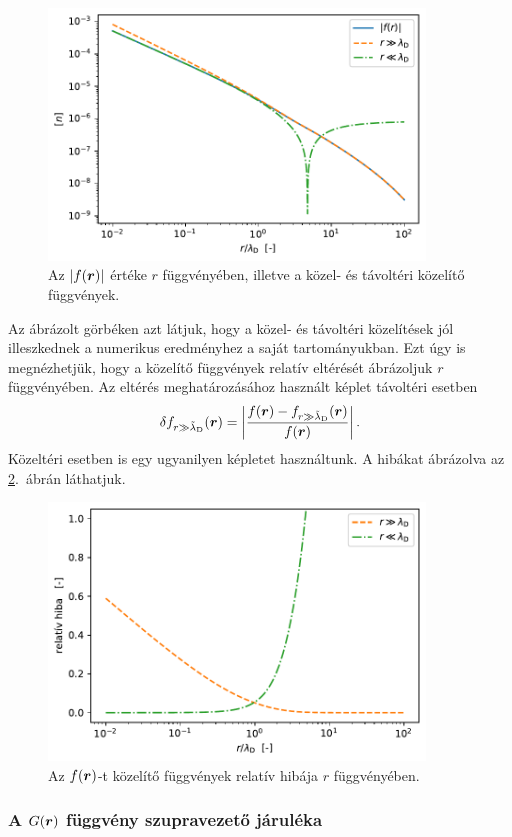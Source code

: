 \documentclass[a4paper,12pt,titlepage]{article}
\newcommand{\RR}{{\vb*{r}}}
\begin{document}
\begin{figure}[h!]
	\centering
	\includegraphics[width=10cm]{F_sc.pdf}
	\caption{Az $\left| f(\RR) \right|$ értéke $r$ függvényében, illetve a közel- és távoltéri közelítő függvények.}
	\label{F-sc-fig}
\end{figure}

Az ábrázolt görbéken azt látjuk, hogy a közel- és távoltéri közelítések jól illeszkednek a numerikus eredményhez a saját tartományukban.  Ezt úgy is megnézhetjük, hogy a közelítő függvények relatív eltérését ábrázoljuk $r$ függvényében.  Az eltérés meghatározásához használt képlet távoltéri esetben
$$ \delta f_{r \gg \tilde{\lambda}_\text{D}}(\RR) = \left| \frac{f(\RR) - f_{r \gg \tilde{\lambda}_\text{D}}(\RR)}{f(\RR)} \right|. $$
Közeltéri esetben is egy ugyanilyen képletet használtunk.  A hibákat ábrázolva az \ref{F-sc-error-fig}.\ ábrán láthatjuk.

\begin{figure}[h!]
	\centering
	\includegraphics[width=10cm]{F_sc_error.pdf}
	\caption{Az $f(\RR)$-t közelítő függvények relatív hibája $r$ függvényében.}
	\label{F-sc-error-fig}
\end{figure}


\subsubsection{A $G(\RR)$ függvény szupravezető járuléka}
\end{document}
